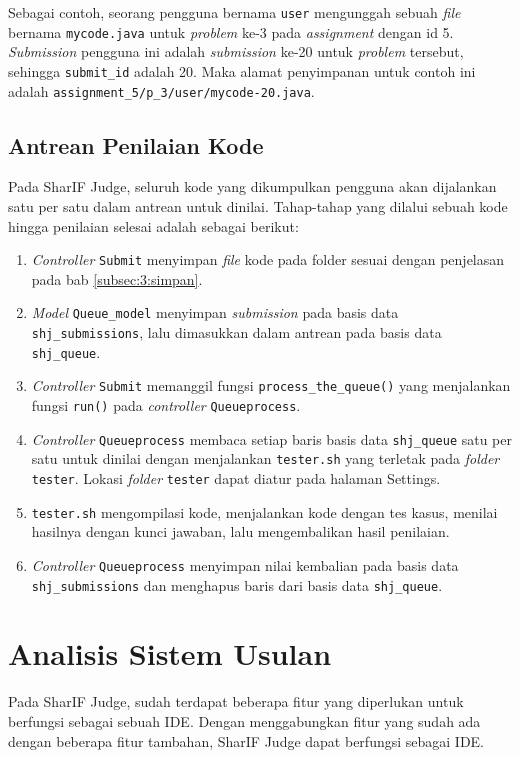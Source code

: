 Sebagai contoh, seorang pengguna bernama \verb|user| mengunggah sebuah \textit{file} bernama \verb|mycode.java| untuk \textit{problem} ke-3 pada \textit{assignment} dengan id 5. \textit{Submission} pengguna ini adalah \textit{submission} ke-20 untuk \textit{problem} tersebut, sehingga \verb|submit_id| adalah 20. Maka alamat penyimpanan untuk contoh ini adalah \verb|assignment_5/p_3/user/mycode-20.java|.


\subsection{Antrean Penilaian Kode}
\label{subsec:3:antrean} 
Pada SharIF Judge, seluruh kode yang dikumpulkan pengguna akan dijalankan satu per satu dalam antrean untuk dinilai. Tahap-tahap yang dilalui sebuah kode hingga penilaian selesai adalah sebagai berikut:

\begin{enumerate}
    \item \textit{Controller} \verb|Submit| menyimpan \textit{file} kode pada folder sesuai dengan penjelasan pada bab \ref{subsec:3:simpan}.
    \item \textit{Model} \verb|Queue_model| menyimpan \textit{submission} pada basis data \verb|shj_submissions|, lalu dimasukkan dalam antrean pada basis data \verb|shj_queue|.
    \item \textit{Controller} \verb|Submit| memanggil fungsi \verb|process_the_queue()| yang menjalankan fungsi \verb|run()| pada \textit{controller} \verb|Queueprocess|.
    \item \textit{Controller} \verb|Queueprocess| membaca setiap baris basis data \verb|shj_queue| satu per satu untuk dinilai dengan menjalankan \verb|tester.sh| yang terletak pada \textit{folder} \verb|tester|. Lokasi \textit{folder} \verb|tester| dapat diatur pada halaman Settings.
    \item \verb|tester.sh| mengompilasi kode, menjalankan kode dengan tes kasus, menilai hasilnya dengan kunci jawaban, lalu mengembalikan hasil penilaian.
    \item \textit{Controller} \verb|Queueprocess| menyimpan nilai kembalian pada basis data \verb|shj_submissions| dan menghapus baris dari basis data \verb|shj_queue|.
\end{enumerate}

\section{Analisis Sistem Usulan}
\label{sec:3:analisisusulan} 
Pada SharIF Judge, sudah terdapat beberapa fitur yang diperlukan untuk berfungsi sebagai sebuah IDE. Dengan menggabungkan fitur yang sudah ada dengan beberapa fitur tambahan, SharIF Judge dapat berfungsi sebagai IDE.


